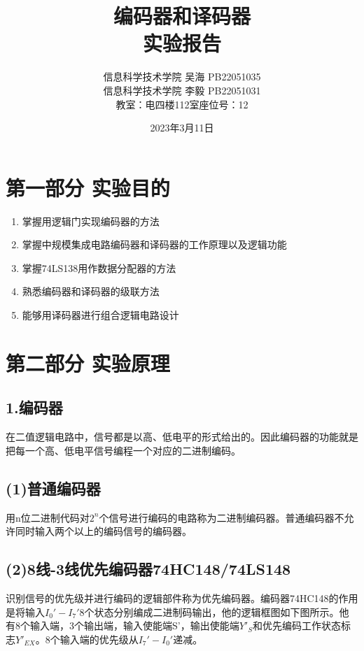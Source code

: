 \documentclass{ctexart}
\title{\Large 编码器和译码器\\{\large 实验报告}}
\author{\large  信息科学技术学院 \quad 吴海\MyFont{垚} PB22051035 \\\large  信息科学技术学院 \quad 李\quad 毅 PB22051031 \\{教室：电四楼112室\quad 座位号：12}}
\date{2023年3月11日}
\begin{document}
    \maketitle
    \thispagestyle{empty}
    
    \newpage 
    \setcounter{page}{1}

    \section*{第一部分 \quad 实验目的}
    \begin{enumerate}
        \item 掌握用逻辑门实现编码器的方法
        \item 掌握中规模集成电路编码器和译码器的工作原理以及逻辑功能
        \item 掌握74LS138用作数据分配器的方法
        \item 熟悉编码器和译码器的级联方法
        \item 能够用译码器进行组合逻辑电路设计
    \end{enumerate}
    \section*{第二部分 \quad 实验原理}
    \subsection*{1.编码器}
    在二值逻辑电路中，信号都是以高、低电平的形式给出的。因此编码器的功能就是把每一个高、低电平信号编程一个对应的二进制编码。
    \subsection*{(1)普通编码器}
    用n位二进制代码对$2^n$个信号进行编码的电路称为二进制编码器。普通编码器不允许同时输入两个以上的编码信号的编码器。
    \subsection*{(2)8线-3线优先编码器74HC148/74LS148}
    识别信号的优先级并进行编码的逻辑部件称为优先编码器。编码器74HC148的作用是将输入$I_0'-I_7'$8个状态分别编成二进制码输出，他的逻辑框图如下图所示。他有8个输入端，3个输出端，输入使能端S'，输出使能端$Y'_S$和优先编码工作状态标志$Y'_{EX}$。8个输入端的优先级从$I_7'-I_0'$递减。
\end{document}
